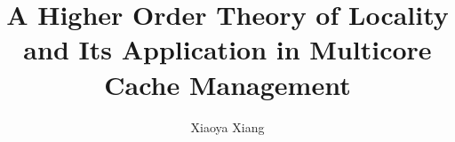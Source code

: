 \documentclass[12pt]{report}
\begin{document}
\title{A Higher Order Theory of Locality and Its Application in
  Multicore Cache Management}
\author{Xiaoya Xiang}

\maketitle

\newtheorem{theorem}{\sc \bf Theorem}[section]
\newtheorem{lemma}[theorem]{\sc \bf Lemma}
\newtheorem{fact}[theorem]{\sc \bf Fact}
\newtheorem{corollary}[theorem]{\sc Corollary}
\newtheorem{definition}[theorem]{\sc Definition}


%
\begin{comment}
\newenvironment{proof}[1][\sc \bf Proof]{\begin{trivlist}
\item[\hskip \labelsep {\bfseries #1}]}{\end{trivlist}}
\newenvironment{definition}[1][\sc \bf Definition]{\begin{trivlist}
\item[\hskip \labelsep {\bfseries #1}]}{\end{trivlist}}
\newenvironment{example}[1][\sc \bf Example]{\begin{trivlist}
\item[\hskip \labelsep {\bfseries #1}]}{\end{trivlist}}
\newenvironment{remark}[1][\sc \bf Remark]{\begin{trivlist}
\item[\hskip \labelsep {\bfseries #1}]}{\end{trivlist}}

\newcommand{\qed}{\nobreak \ifvmode \relax \else
      \ifdim\lastskip<1.5em \hskip-\lastskip
      \hskip1.5em plus0em minus0.5em \fi \nobreak
      \vrule height0.75em width0.5em depth0.25em\fi}
\end{comment}
\end{document}
